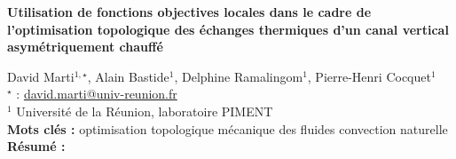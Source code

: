 


    \newpage


%
\begin{flushleft}
\addtocounter{section}{1}
{\Large \textbf{Utilisation de fonctions objectives locales dans le cadre de l'optimisation topologique des échanges thermiques d'un canal vertical asymétriquement chauffé}}\label{ref:43}
\end{flushleft}
%
David Marti$^{1,\star}$, Alain Bastide$^{1}$, Delphine Ramalingom$^{1}$, Pierre-Henri Cocquet$^{1}$\\[2mm]
$^{\star}$ \Letter : \url{david.marti@univ-reunion.fr}\\[2mm]
{\footnotesize $^{1}$ Université de la Réunion, laboratoire PIMENT}\\
[4mm]
%
\noindent \textbf{Mots clés : } optimisation topologique mécanique des fluides convection naturelle\\[4mm]
%
\noindent \textbf{Résumé : } 

